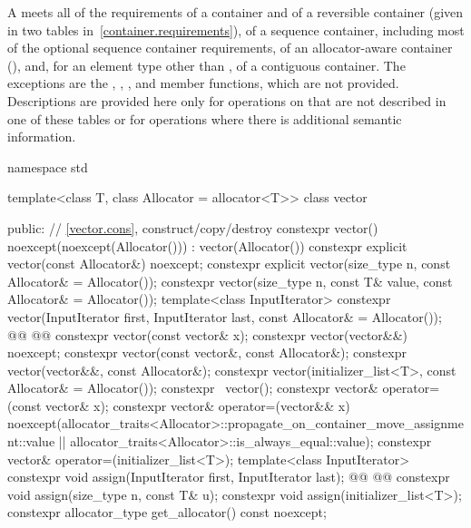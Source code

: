 \documentclass{wg21}
\begin{document}
\pnum
A  meets all of the requirements of a container and of a
reversible container (given in two tables in~\ref{container.requirements}), of a
sequence container, including most of the optional sequence container
requirements, of an allocator-aware container
(),
and, for an element type other than ,
of a contiguous container.
The exceptions are the
, , , and  member functions, which are not
provided. Descriptions are provided here only for operations on 
that are not described in one of these tables or for operations where there is
additional semantic information.

\begin{codeblock}
namespace std {
    template<class T, class Allocator = allocator<T>>
    class vector {
        public:
        // \ref{vector.cons}, construct/copy/destroy
        constexpr vector() noexcept(noexcept(Allocator())) : vector(Allocator()) { }
        constexpr explicit vector(const Allocator&) noexcept;
        constexpr explicit vector(size_type n, const Allocator& = Allocator());
        constexpr vector(size_type n, const T& value, const Allocator& = Allocator());
        template<class InputIterator>
        constexpr vector(InputIterator first, InputIterator last, const Allocator& = Allocator());
        @@
        @@
        constexpr vector(const vector& x);
        constexpr vector(vector&&) noexcept;
        constexpr vector(const vector&, const Allocator&);
        constexpr vector(vector&&, const Allocator&);
        constexpr vector(initializer_list<T>, const Allocator& = Allocator());
        constexpr ~vector();
        constexpr vector& operator=(const vector& x);
        constexpr vector& operator=(vector&& x)
        noexcept(allocator_traits<Allocator>::propagate_on_container_move_assignment::value ||
        allocator_traits<Allocator>::is_always_equal::value);
        constexpr vector& operator=(initializer_list<T>);
        template<class InputIterator>
        constexpr void assign(InputIterator first, InputIterator last);
        @@
        @@
        constexpr void assign(size_type n, const T& u);
        constexpr void assign(initializer_list<T>);
        constexpr allocator_type get_allocator() const noexcept;

}}
\end{codeblock}
\end{document}

